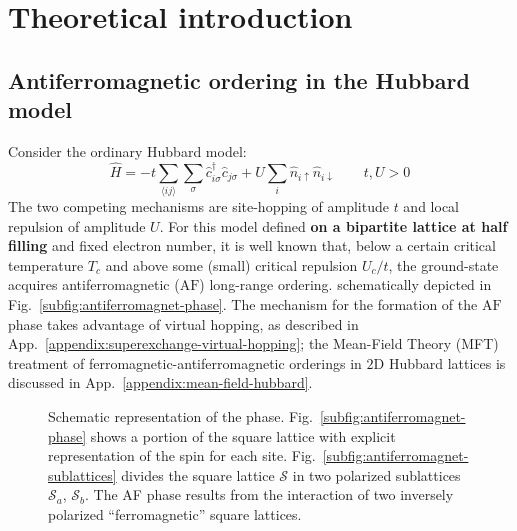 \chapter{Theoretical introduction}\label{chapter:theoretical-introduction}

\todo

\section{Antiferromagnetic ordering in the Hubbard model}\label{sec:antiferromagnetic-ordering-hubbard}

Consider the ordinary Hubbard model:
\begin{equation}\label{eq:hubbard-model}
	\hat H = 
	-t \sum_{\langle ij \rangle} \sum_\sigma \hat c_{i\sigma}^\dagger \hat c_{j\sigma}
	+ U \sum_i \hat n_{i\uparrow} \hat n_{i\downarrow}
	\qquad
	t, U  > 0
\end{equation}
The two competing mechanisms are site-hopping of amplitude $t$ and local repulsion of amplitude $U$. For this model defined \textbf{on a bipartite lattice at half filling} and fixed electron number, it is well known \cite{hirsch1985hubbard} that, below a certain critical temperature $T_c$ and above some (small) critical repulsion $U_c/t$, the ground-state acquires antiferromagnetic ($\mathrm{AF}$) long-range ordering. schematically depicted in Fig.~\ref{subfig:antiferromagnet-phase}. The mechanism for the formation of the $\mathrm{AF}$ phase takes advantage of virtual hopping, as described in App.~\ref{appendix:superexchange-virtual-hopping}; the Mean-Field Theory (MFT) treatment of ferromagnetic-antiferromagnetic orderings in $2\mathrm{D}$ Hubbard lattices is discussed in  App.~\ref{appendix:mean-field-hubbard}.

\begin{figure}
	\centering
	\hfil
	\caption{Schematic representation of the \AF phase. Fig.~\ref{subfig:antiferromagnet-phase} shows a portion of the square lattice with explicit representation of the spin for each site. Fig.~\ref{subfig:antiferromagnet-sublattices} divides the square lattice $\mathcal{S}$ in two polarized sublattices $\mathcal{S}_a$, $\mathcal{S}_b$. The AF phase results from the interaction of two inversely polarized ``ferromagnetic'' square lattices.}
	\label{fig:antiferromagnet-schemes}
\end{figure}

